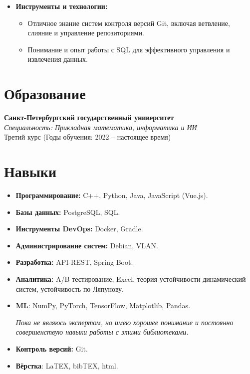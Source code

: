 \documentclass[a4paper,10pt]{article}
\begin{document}
\begin{itemize}
    \item \textbf{Инструменты и технологии:}
    \begin{itemize}
        \item Отличное знание систем контроля версий Git, включая ветвление, слияние и управление репозиториями.
        \item Понимание и опыт работы с SQL для эффективного управления и извлечения данных.
    \end{itemize}
\end{itemize}

\vspace{0.5cm}

\section*{Образование}

\textbf{Санкт-Петербургский государственный университет} \\
\textit{Специальность: Прикладная математика, информатика и ИИ} \\
Третий курс (Годы обучения: 2022 – настоящее время)

\vspace{0.5cm}

\section*{Навыки}

\begin{itemize}
    \item \textbf{Программирование:} C++, Python, Java, JavaScript (Vue.js).
    \item \textbf{Базы данных:} PostgreSQL, SQL.
    \item \textbf{Инструменты DevOps:} Docker, Gradle.
    \item \textbf{Администрирование систем:} Debian, VLAN.
    \item \textbf{Разработка:} API-REST, Spring Boot.
    \item \textbf{Аналитика:} A/B тестирование, Excel, теория устойчивости динамический систем, устойчивость по Ляпунову.
    \item \textbf{ML}: NumPy, PyTorch, TensorFlow, Matplotlib, Pandas.
    
        \textit{Пока не являюсь экспертом, но имею хорошее понимание и постоянно совершенствую навыки работы с этими библиотеками.}
    \item \textbf{Контроль версий:} Git.
    \item \textbf{Вёрстка}: LaTEX, bibTEX, html.
\end{itemize}
\end{document}
